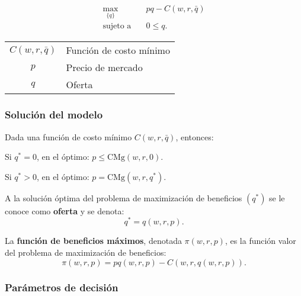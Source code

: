 \documentclass[8pt,a4paper]{extarticle}
\begin{document}
\begin{multicols}{3}
	\begin{equation*}
		\begin{aligned}
			\max_{\{q\}}\         & pq - C(w, r, \bar{q}) \\
			\text{sujeto a} \quad & 0 \le q.
		\end{aligned}
	\end{equation*}

	\begin{center}
		\begin{tabular}{ c l }
			\hline
			$C(w, r, \bar{q})$ & Función de costo mínimo \\
			$p$                & Precio de mercado       \\
			$q$                & Oferta                  \\
			\hline
		\end{tabular}
	\end{center}

	\subsubsection*{Solución del modelo}

	Dada una función de costo mínimo $C (w, r, \bar{q})$, entonces:

	\begin{bulletlist}
		\item Si $q^* = 0$, en el óptimo: $p \le \text{CMg} (w, r, 0)$.
		\item Si $q^* > 0$, en el óptimo: $p = \text{CMg} (w, r, q^*)$.
	\end{bulletlist}

	\begin{boxdef}[Oferta]
		A la solución óptima del problema de maximización de beneficios $(q^*)$ se le conoce como \textbf{oferta} y se denota:
		\[
			q^* = q(w, r, p)
			.\]
	\end{boxdef}

	\begin{boxdef}
		La \textbf{función de beneficios máximos}, denotada $\pi(w, r, p)$, es la función valor del problema de maximización de beneficios:
		\[
			\pi (w, r, p) = pq(w, r, p) - C (w, r, q(w, r, p))
			.\]
	\end{boxdef}

	\subsubsection*{Parámetros de decisión}


\end{multicols}
\end{document}
